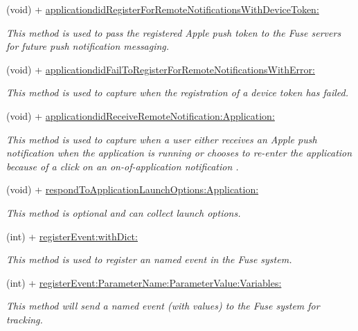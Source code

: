 \begin{DoxyCompactItemize}
(void) + \hyperlink{interface_fuse_s_d_k_a94479850c3b0c60887b96bb9cfa714e6}{applicationdid\+Register\+For\+Remote\+Notifications\+With\+Device\+Token\+:}
\begin{DoxyCompactList}\small\item\em This method is used to pass the registered Apple push token to the Fuse servers for future push notification messaging. \end{DoxyCompactList}\item 
(void) + \hyperlink{interface_fuse_s_d_k_ac3d0b5c1336b7a2883a6693fd4696ea0}{applicationdid\+Fail\+To\+Register\+For\+Remote\+Notifications\+With\+Error\+:}
\begin{DoxyCompactList}\small\item\em This method is used to capture when the registration of a device token has failed. \end{DoxyCompactList}\item 
(void) + \hyperlink{interface_fuse_s_d_k_a527313014384e35bf0537595295e1224}{applicationdid\+Receive\+Remote\+Notification\+:\+Application\+:}
\begin{DoxyCompactList}\small\item\em This method is used to capture when a user either receives an Apple push notification when the application is running or chooses to re-\/enter the application because of a click on an on-\/of-\/application notification . \end{DoxyCompactList}\item 
(void) + \hyperlink{interface_fuse_s_d_k_aa37c46cc4e49f09fd9b2b40a548b61fc}{respond\+To\+Application\+Launch\+Options\+:\+Application\+:}
\begin{DoxyCompactList}\small\item\em This method is optional and can collect launch options. \end{DoxyCompactList}\item 
(int) + \hyperlink{interface_fuse_s_d_k_a6956b2da78e9c5cda4006c93ddfa6718}{register\+Event\+:with\+Dict\+:}
\begin{DoxyCompactList}\small\item\em This method is used to register an named event in the Fuse system. \end{DoxyCompactList}\item 
(int) + \hyperlink{interface_fuse_s_d_k_ab95f385678dcb21bd5dbccf2ec26a760}{register\+Event\+:\+Parameter\+Name\+:\+Parameter\+Value\+:\+Variables\+:}
\begin{DoxyCompactList}\small\item\em This method will send a named event (with values) to the Fuse system for tracking. \end{DoxyCompactList}\item 

\end{DoxyCompactItemize}
